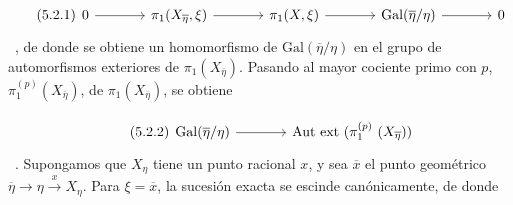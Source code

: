 \begin{equation}\tag{5.2.1}
\begin{tikzcd}[column sep=large, row sep=tiny]
0 \sisi{\arrow[r, dash]}{\arrow[r]} & \pi_1(X_{\overline{\eta}},\xi) \arrow[r] & \pi_1(X,\xi) \arrow[r] & \mathrm{Gal}(\overline{\eta}/\eta) \arrow[r] & 0
\end{tikzcd}
\end{equation}\ ,
de donde se obtiene un homomorfismo de $\mathrm{Gal}(\overline{\eta}/\eta)$ en el grupo de automorfismos exteriores de $\pi_1(X_{\overline{\eta}})$. Pasando al mayor cociente primo con $p$, $\pi_1^{(p)}(X_{\overline{\eta}})$, de $\pi_1(X_{\overline{\eta}})$, se obtiene

\begin{equation}\tag{5.2.2}
\begin{tikzcd}[column sep=large, row sep=tiny]
\mathrm{Gal}(\overline{\eta}/\eta) \arrow[r] & \mathrm{Aut}\ \mathrm{ext}\ (\pi_1^{(p)}\ (X_{\overline{\eta}}))
\end{tikzcd}
\end{equation}\ .
Supongamos que $X_\eta$ tiene un punto racional $x$, y sea $\overline{x}$ el punto geométrico $\overline{\eta} \longrightarrow \eta \xrightarrow{\ x\ } X_\eta$. Para $\xi = \overline{x}$, la sucesión exacta  se escinde canónicamente, de donde


